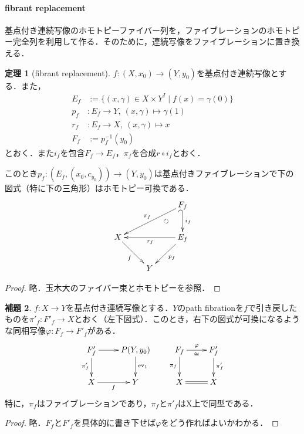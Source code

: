 \documentclass[a4paper,11pt]{jsarticle}
\theoremstyle{definition}
\newtheorem{thm}{定理}[section]
\newtheorem{lem}[thm]{補題}
\begin{document}
\paragraph{fibrant replacement}
基点付き連続写像のホモトピーファイバー列を，ファイブレーションのホモトピー完全列を利用して作る．そのために，連続写像をファイブレーションに置き換える．
\begin{thm}[fibrant replacement]
  $f\colon (X,x_0)\to (Y,y_0)$を基点付き連続写像とする．また，\begin{align*}
    E_f&:=\{(x,\gamma)\in X\times Y^I\mid f(x)=\gamma(0)\}\\
    p_f&\colon E_f\to Y,\ (x,\gamma)\mapsto \gamma(1)\\
    r_f&\colon E_f\to X,\ (x,\gamma)\mapsto x\\
    F_f&:=p_f^{-1}(y_0)
  \end{align*}
  とおく．また$i_f$を包含$F_f\to E_f$，$\pi_f$を合成$r\circ i_f$とおく．
  
  このとき$p_f\colon (E_f,(x_0,c_{y_0}))\to(Y,y_0)$は基点付きファイブレーションで下の図式（特に下の三角形）はホモトピー可換である．
  \[\xymatrix{
    &&F_f\ar@{_(->}[d]^{i_f}\ar[lld]_{\pi_f}\\
    X\ar[dr]_f & \ar@{}[ur]|{\circlearrowright}&E_f\ar[ll]^{r_f} \ar[dl]^{p_f}\\
    &Y&
  }\]
\end{thm}
  \begin{proof}
    略．玉木大のファイバー束とホモトピーを参照．
  \end{proof}
  \begin{lem}$f\colon X\to Y$を基点付き連続写像とする．$Y$のpath fibrationを$f$で引き戻したものを$\pi'_f\colon F'_f\to X$とおく（左下図式）．このとき，右下の図式が可換になるような同相写像$\varphi\colon F_f\to F'_f$がある．
    \[
    \xymatrix{
      F'_f\ar[d]_{\pi'_f}\ar[r]&P(Y,y_0)\ar[d]^{\mathrm{ev}_1}&F_f\ar[r]^{\varphi}_{\cong}\ar[d]_{\pi_f}&F'_f\ar[d]^{\pi'_f}\\
      X\ar[r]_f&Y&X\ar@{=}[r]&X
    }  
    \]
    特に，$\pi_f$はファイブレーションであり，$\pi_f$と$\pi'_f$はX上で同型である．
  \end{lem}
  \begin{proof}
    略．$F_f$と$F'_f$を具体的に書き下せば$\varphi$をどう作ればよいかわかる．
  \end{proof}
\end{document}

